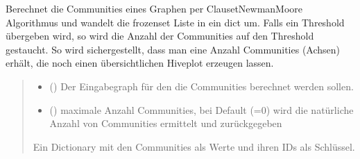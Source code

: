 \documentclass[a4paper,10pt,ngerman]{sphinxmanual}
\begin{document}
\begin{fulllineitems}
\label{\detokenize{api:src.partitioning.clauset_newman_moore_communities}}
\pysigstartsignatures
\pysiglinewithargsret
{}
{\sphinxparamcomma {}}
{}
\pysigstopsignatures
\sphinxAtStartPar
Berechnet die Communities eines Graphen per Clauset\sphinxhyphen{}Newman\sphinxhyphen{}Moore Algorithmus und wandelt die frozenset Liste in ein dict um.
Falls ein Threshold übergeben wird, so wird die Anzahl der Communities auf den Threshold gestaucht. So wird sichergestellt, dass man
eine Anzahl Communities (Achsen) erhält, die noch einen übersichtlichen Hiveplot erzeugen lassen.
\begin{quote}\begin{description}
\begin{itemize}
\item {} 
\sphinxAtStartPar
{} () \textendash{} Der Eingabegraph für den die Communities berechnet werden sollen.

\item {} 
\sphinxAtStartPar
{} () \textendash{} maximale Anzahl Communities, bei Default (=0) wird die natürliche Anzahl von Communities ermittelt und zurückgegeben

\end{itemize}

\sphinxAtStartPar
Ein Dictionary mit den Communities als Werte und ihren IDs als Schlüssel.

\sphinxAtStartPar
{}

\end{description}\end{quote}

\end{fulllineitems}

\end{document}
